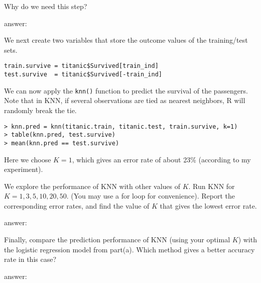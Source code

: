 \documentclass{article}
\newcommand{\answerbox}[1]{
	\begin{center}
		\ifdefined\printsol
			\begin{mdframed}
				\begin{minipage}{0.95\textwidth}
					{\color{blue} {#1}}
				\end{minipage}
			\end{mdframed}
		\else
			\begin{mdframed}
				\begin{minipage}{0.95\textwidth}
					\phantom{\parbox{\linewidth}{#1}}
				\end{minipage}
			\end{mdframed}
		\fi
		\end{center}
	}
\begin{document}
Why do we need this step?
\answerbox{ answer:
}


We next create two variables that store the outcome values of the training/test sets.

\begin{Verbatim}[frame=single]
train.survive = titanic$Survived[train_ind]
test.survive  = titanic$Survived[-train_ind]
\end{Verbatim}

We can now apply the \texttt{knn()} function to predict the survival of the passengers. Note that in KNN, if several observations are tied as nearest neighbors, R will randomly break the tie.
\begin{Verbatim}[frame=single]
> knn.pred = knn(titanic.train, titanic.test, train.survive, k=1)
> table(knn.pred, test.survive)
> mean(knn.pred == test.survive)
\end{Verbatim}
Here we choose $K=1$, which gives an error rate of about 23\% (according to my experiment).
\bigskip

We explore the performance of KNN with other values of $K$.
Run KNN for $K=1,3,5,10,20,50$. (You may use a for loop for convenience). Report the corresponding error rates, and find the value of $K$ that gives the lowest error rate.
\answerbox{
answer:
}

\bigskip

Finally, compare the prediction performance of KNN (using your optimal $K$) with the logistic regression model from part(a). Which method gives a better accuracy rate in this case?
\answerbox{
answer:
}
\smallskip
\end{document}
